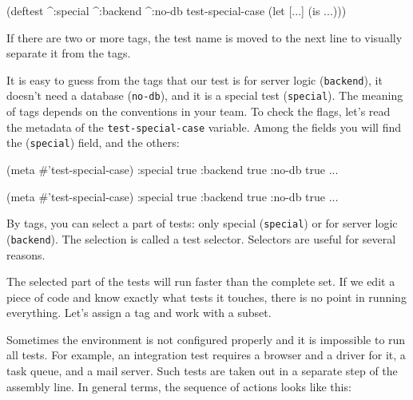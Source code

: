 \begin{english}
  \begin{clojure}
(deftest ^:special ^:backend ^:no-db
  test-special-case
  (let [...]
    (is ...)))
  \end{clojure}
\end{english}

\noindent
If there are two or more tags, the test name is moved to the next line to visually separate it from the tags.

It is easy to guess from the tags that our test is for server logic (\verb|backend|), it doesn't need a database (\verb|no-db|), and it is a special test (\verb|special|). The meaning of tags depends on the conventions in your team. To check the flags, let's read the metadata of the \verb|test-special-case| variable. Among the fields you will find the (\verb|special|) field, and the others:

\ifx\DEVICETYPE\MOBILE

\begin{english}
  \begin{clojure}
(meta #'test-special-case)
{:special true
 :backend true
 :no-db true ...}
  \end{clojure}
\end{english}

\else

\begin{english}
  \begin{clojure}
(meta #'test-special-case)
{:special true :backend true :no-db true ...}
  \end{clojure}
\end{english}

\fi

By tags, you can select a part of tests: only special (\verb|special|) or for server logic (\verb|backend|). The selection is called a test selector. Selectors are useful for several reasons.

The selected part of the tests will run faster than the complete set. If we edit a piece of code and know exactly what tests it touches, there is no point in running everything. Let's assign a tag and work with a subset.

Sometimes the environment is not configured properly and it is impossible to run all tests. For example, an integration test requires a browser and a driver for it, a task queue, and a mail server. Such tests are taken out in a separate
step of the assembly line. In general terms, the sequence of actions looks like this:

